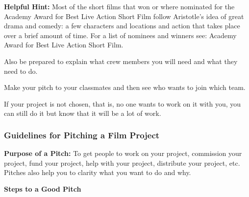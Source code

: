 \documentclass[
]{book}
\begin{document}
\begin{caution}
\textbf{Helpful Hint:} Most of the short films that won or where nominated for the Academy Award for Best Live Action Short Film follow Aristotle's idea of great drama and comedy: a few characters and locations and action that takes place over a brief amount of time. For a list of nominees and winners see: Academy Award for Best Live Action Short Film.
\end{caution}

\begin{reflect}
Also be prepared to explain what crew members you will need and what they need to do.

Make your pitch to your classmates and then see who wants to join which team.

If your project is not chosen, that is, no one wants to work on it with you, you can still do it but know that it will be a lot of work.

\hypertarget{guidelines-for-pitching-a-film-project-1}{%
\subsubsection*{Guidelines for Pitching a Film Project}\label{guidelines-for-pitching-a-film-project-1}}

\textbf{Purpose of a Pitch:} To get people to work on your project, commission your
project, fund your project, help with your project, distribute your project,
etc. Pitches also help you to clarity what you want to do and why.

\textbf{Steps to a Good Pitch}


\end{reflect}
\end{document}
